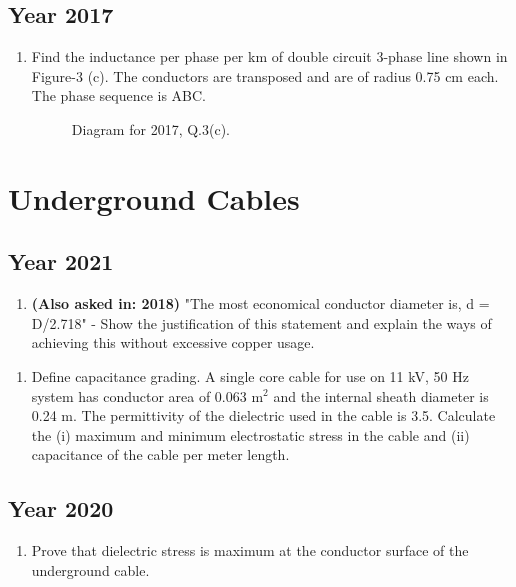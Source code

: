 \documentclass[12pt, a4paper]{article}
\begin{document}
	\subsection{Year 2017}
	\begin{enumerate}[label=\textbf{Q3(c).}, wide, labelindent=0pt]
		\item Find the inductance per phase per km of double circuit 3-phase line shown in Figure-3 (c). The conductors are transposed and are of radius 0.75 cm each. The phase sequence is ABC.
		\begin{figure}[h!]
			\centering
			\caption{Diagram for 2017, Q.3(c).}
		\end{figure}
	\end{enumerate}
	
	
	\section{Underground Cables}
	\subsection{Year 2021}
	\begin{enumerate}[label=\textbf{Q6(b).}, wide, labelindent=0pt]
		\item \textbf{(Also asked in: 2018)} "The most economical conductor diameter is, d = D/2.718" - Show the justification of this statement and explain the ways of achieving this without excessive copper usage.
	\end{enumerate}
	\begin{enumerate}[label=\textbf{Q6(c).}, wide, labelindent=0pt]
		\item Define capacitance grading. A single core cable for use on 11 kV, 50 Hz system has conductor area of 0.063 m$^2$ and the internal sheath diameter is 0.24 m. The permittivity of the dielectric used in the cable is 3.5. Calculate the (i) maximum and minimum electrostatic stress in the cable and (ii) capacitance of the cable per meter length.
	\end{enumerate}
	
	\subsection{Year 2020}
	\begin{enumerate}[label=\textbf{Q7(b).}, wide, labelindent=0pt]
		\item Prove that dielectric stress is maximum at the conductor surface of the underground cable.
	\end{enumerate}
	
\end{document}
